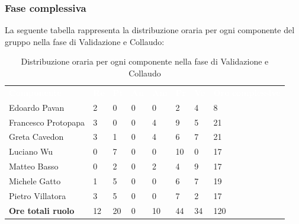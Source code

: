 \subsubsection{Fase complessiva}
La seguente tabella rappresenta la distribuzione oraria per ogni componente del gruppo nella fase di Validazione e Collaudo:
\begin{table}[H]
\begin{center}
\renewcommand{\arraystretch}{1.25}
\begin{tabular}{ m{}<{\centering}  m{}<{\centering} m{}<{\centering} m{}<{\centering}  m{}<{\centering}  m{}<{\centering}  m{}<{\centering}  m{}<{\centering}   }
	\rowcolor{darkblue}
	\textcolor{white}{\textbf{Componente}} &\textcolor{white}{\textbf{Re}}&\textcolor{white}{\textbf{Pt}}&\textcolor{white}{\textbf{An}}&\textcolor{white}{\textbf{Am}}&\textcolor{white}{\textbf{Pr}}&\textcolor{white}{\textbf{Ve}}&\textcolor{white}{\textbf{Ore complessive}}\\ 
	Edoardo Pavan & 2 & 0 & 0 & 0 & 2 & 4 & 8 \\	
	
	Francesco Protopapa & 3 & 0 & 0 & 4 & 9 & 5 & 21 \\

	Greta Cavedon & 3 & 1 & 0 & 4 & 6 & 7 & 21 \\
	
	Luciano Wu & 0 & 7 & 0 & 0 & 10 & 0 & 17 \\
	
	Matteo Basso & 0 & 2 & 0 & 2 & 4 & 9 & 17 \\
	
	Michele Gatto & 1 & 5 & 0 & 0 & 6 & 7 & 19 \\
	
	Pietro Villatora & 3 & 5 & 0 & 0 & 7 & 2 & 17 \\
	
	\textbf{Ore totali ruolo} & 12 & 20 & 0 & 10 & 44 & 34 & 120\\

\end{tabular}
\caption{Distribuzione oraria per ogni componente nella fase di Validazione e Collaudo}
\end{center}
\end{table}

